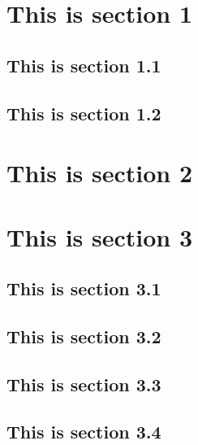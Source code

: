 \documentclass{amsart}
\theoremstyle{plain}
\theoremstyle{definition}
\theoremstyle{remark}
\numberwithin{theorem}{section}
\begin{document}
\section{This is section 1}

\subsection{This is section 1.1}

\subsection{This is section 1.2}


\section{This is section 2}


\section{This is section 3}

\subsection{This is section 3.1}

\subsection{This is section 3.2}

\subsection{This is section 3.3}

\subsection{This is section 3.4}
\end{document}
